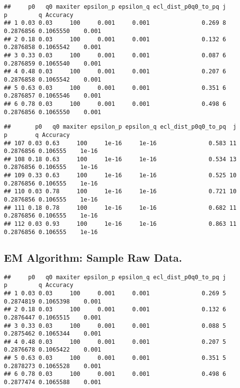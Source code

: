 \documentclass[]{article}
\begin{document}
\begin{verbatim}
##     p0   q0 maxiter epsilon_p epsilon_q ecl_dist_p0q0_to_pq j         p         q Accuracy
## 1 0.03 0.03     100     0.001     0.001               0.269 8 0.2876856 0.1065550    0.001
## 2 0.18 0.03     100     0.001     0.001               0.132 6 0.2876858 0.1065542    0.001
## 3 0.33 0.03     100     0.001     0.001               0.087 6 0.2876859 0.1065540    0.001
## 4 0.48 0.03     100     0.001     0.001               0.207 6 0.2876858 0.1065542    0.001
## 5 0.63 0.03     100     0.001     0.001               0.351 6 0.2876857 0.1065546    0.001
## 6 0.78 0.03     100     0.001     0.001               0.498 6 0.2876856 0.1065550    0.001
\end{verbatim}

\begin{verbatim}
##       p0   q0 maxiter epsilon_p epsilon_q ecl_dist_p0q0_to_pq  j         p        q Accuracy
## 107 0.03 0.63     100     1e-16     1e-16               0.583 11 0.2876856 0.106555    1e-16
## 108 0.18 0.63     100     1e-16     1e-16               0.534 13 0.2876856 0.106555    1e-16
## 109 0.33 0.63     100     1e-16     1e-16               0.525 10 0.2876856 0.106555    1e-16
## 110 0.03 0.78     100     1e-16     1e-16               0.721 10 0.2876856 0.106555    1e-16
## 111 0.18 0.78     100     1e-16     1e-16               0.682 11 0.2876856 0.106555    1e-16
## 112 0.03 0.93     100     1e-16     1e-16               0.863 11 0.2876856 0.106555    1e-16
\end{verbatim}

\subsection{EM Algorithm: Sample Raw
Data.}\label{em-algorithm-sample-raw-data.}

\begin{verbatim}
##     p0   q0 maxiter epsilon_p epsilon_q ecl_dist_p0q0_to_pq j         p         q Accuracy
## 1 0.03 0.03     100     0.001     0.001               0.269 5 0.2874819 0.1065398    0.001
## 2 0.18 0.03     100     0.001     0.001               0.132 6 0.2876447 0.1065515    0.001
## 3 0.33 0.03     100     0.001     0.001               0.088 5 0.2875462 0.1065344    0.001
## 4 0.48 0.03     100     0.001     0.001               0.207 5 0.2876678 0.1065422    0.001
## 5 0.63 0.03     100     0.001     0.001               0.351 5 0.2878273 0.1065528    0.001
## 6 0.78 0.03     100     0.001     0.001               0.498 6 0.2877474 0.1065588    0.001
\end{verbatim}
\end{document}
